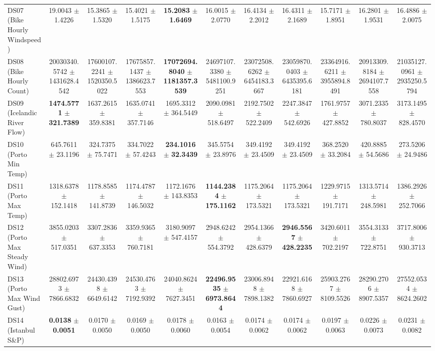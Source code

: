 \begin{table}[t]
{{\begin{tabular}{lcccccccccc}
DS07 (Bike Hourly Windspeed) & 19.0043 $\pm$ 1.4226 & 15.3865 $\pm$ 1.5320 & 15.4021 $\pm$ 1.5175 & \textbf{15.2083} $\pm$ \textbf{1.6469} & 16.0015 $\pm$ 2.0770 & 16.4134 $\pm$ 2.2012 & 16.4311 $\pm$ 2.1689 & 15.7171 $\pm$ 1.8951 & 16.2801 $\pm$ 1.9531 & 16.4886 $\pm$ 2.0075 \\
DS08 (Bike Hourly Count) & 20030340.5742 $\pm$ 1431628.4542 & 17600107.2241 $\pm$ 1520350.5022 & 17675857.1437 $\pm$ 1386623.7553 & \textbf{17072694.8040} $\pm$ \textbf{1181357.3539} & 24697107.3380 $\pm$ 5481100.9251 & 23072508.6262 $\pm$ 6454183.3667 & 23059870.0403 $\pm$ 6435395.6181 & 23364916.6211 $\pm$ 3955894.8491 & 20913309.8184 $\pm$ 2694107.7558 & 21035127.0961 $\pm$ 2935250.5794 \\
DS09 (Icelandic River Flow) & \textbf{1474.5771} $\pm$ \textbf{321.7389} & 1637.2615 $\pm$ 359.8381 & 1635.0741 $\pm$ 357.7146 & 1695.3312 $\pm$ 364.5449 & 2090.0981 $\pm$ 518.6497 & 2192.7502 $\pm$ 522.2409 & 2247.3847 $\pm$ 542.6926 & 1761.9757 $\pm$ 427.8852 & 3071.2335 $\pm$ 780.8037 & 3173.1495 $\pm$ 828.4570 \\
DS10 (Porto Min Temp) & 645.7611 $\pm$ 23.1196 & 324.7375 $\pm$ 75.7471 & 334.7022 $\pm$ 57.4243 & \textbf{234.1016} $\pm$ \textbf{32.3439} & 345.5754 $\pm$ 23.8976 & 349.4192 $\pm$ 23.4509 & 349.4192 $\pm$ 23.4509 & 368.2520 $\pm$ 33.2084 & 420.8885 $\pm$ 54.5686 & 273.5206 $\pm$ 24.9486 \\
DS11 (Porto Max Temp) & 1318.6378 $\pm$ 152.1418 & 1178.8585 $\pm$ 141.8739 & 1174.4787 $\pm$ 146.5032 & 1172.1676 $\pm$ 143.8353 & \textbf{1144.2384} $\pm$ \textbf{175.1162} & 1175.2064 $\pm$ 173.5321 & 1175.2064 $\pm$ 173.5321 & 1229.9715 $\pm$ 191.7171 & 1313.5714 $\pm$ 248.5981 & 1386.2926 $\pm$ 252.7066 \\
DS12 (Porto Max Steady Wind) & 3855.0203 $\pm$ 517.0351 & 3307.2836 $\pm$ 637.3353 & 3359.9365 $\pm$ 760.7181 & 3180.9097 $\pm$ 547.4157 & 2948.6242 $\pm$ 554.3792 & 2954.1366 $\pm$ 428.6379 & \textbf{2946.5567} $\pm$ \textbf{428.2235} & 3420.6011 $\pm$ 702.2197 & 3554.3133 $\pm$ 722.8751 & 3717.8006 $\pm$ 930.3713 \\
DS13 (Porto Max Wind Gust) & 28802.6973 $\pm$ 7866.6832 & 24430.4398 $\pm$ 6649.6142 & 24530.4763 $\pm$ 7192.9392 & 24040.8624 $\pm$ 7627.3451 & \textbf{22496.9535} $\pm$ \textbf{6973.8644} & 23006.8948 $\pm$ 7898.1382 & 22921.6168 $\pm$ 7860.6927 & 25903.2767 $\pm$ 8109.5526 & 28290.2706 $\pm$ 8907.5357 & 27552.0534 $\pm$ 8624.2602 \\
DS14 (Istanbul S\&P) & \textbf{0.0138} $\pm$ \textbf{0.0051} & 0.0170 $\pm$ 0.0050 & 0.0169 $\pm$ 0.0050 & 0.0178 $\pm$ 0.0060 & 0.0163 $\pm$ 0.0054 & 0.0174 $\pm$ 0.0062 & 0.0174 $\pm$ 0.0062 & 0.0197 $\pm$ 0.0063 & 0.0226 $\pm$ 0.0073 & 0.0231 $\pm$ 0.0082 \\

\end{tabular}}}
\end{table}
